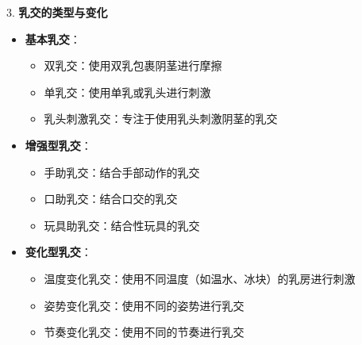 \documentclass[12pt,UTF8]{ctexbook}
\begin{document}
3. \textbf{乳交的类型与变化}
\begin{itemize}
	\item \textbf{基本乳交}：
	\begin{itemize}
		\item 双乳交：使用双乳包裹阴茎进行摩擦
		\item 单乳交：使用单乳或乳头进行刺激
		\item 乳头刺激乳交：专注于使用乳头刺激阴茎的乳交
	\end{itemize}
	\item \textbf{增强型乳交}：
	\begin{itemize}
		\item 手助乳交：结合手部动作的乳交
		\item 口助乳交：结合口交的乳交
		\item 玩具助乳交：结合性玩具的乳交
	\end{itemize}
	\item \textbf{变化型乳交}：
	\begin{itemize}
		\item 温度变化乳交：使用不同温度（如温水、冰块）的乳房进行刺激
		\item 姿势变化乳交：使用不同的姿势进行乳交
		\item 节奏变化乳交：使用不同的节奏进行乳交
	\end{itemize}
\end{itemize}
\end{document}
